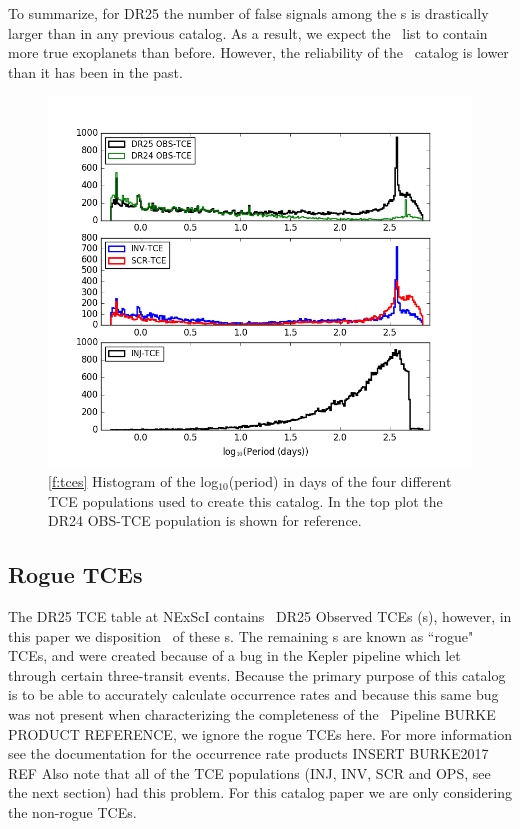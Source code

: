 To summarize, for DR25 the number of false signals among the \opstce s  is drastically larger than in any previous catalog. As a result, we expect the \opstce\ list to contain more true exoplanets than before. However, the reliability of the \opstce\ catalog is lower than it has been in the past.   

\begin{figure}[h!]
 \begin{center}
  \includegraphics[width=1.1\linewidth]{fig-tcePeriods.png}
  \caption{\ref{f:tces} Histogram of the log$_{10}$(period) in days of the four different TCE populations used to create this catalog. In the top plot the DR24 OBS-TCE population is shown for reference.}
 \end{center}
 \end{figure}



\subsection{Rogue TCEs}
The DR25 TCE table at NExScI contains \ntces\ DR25 Observed TCEs (\opstce s), however, in this paper we disposition \ntcesnorogue\ of these \opstce s. The remaining \opstce s are known as ``rogue" TCEs, and were created because of a bug in the Kepler pipeline which let through certain three-transit events. Because the primary purpose of this catalog is to be able to accurately calculate occurrence rates and because this same bug was not present when characterizing the completeness of the \Kepler\ Pipeline \citep{}BURKE PRODUCT REFERENCE, we ignore the rogue TCEs here. For more information see the documentation for the occurrence rate products INSERT BURKE2017 REF%
Also note that all of the TCE populations (INJ, INV, SCR and OPS, see the next section) had this problem. For this catalog paper we are only considering the non-rogue TCEs.